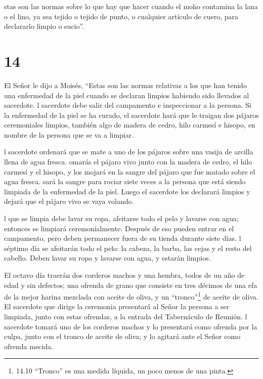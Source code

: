  stas son las normas sobre lo que hay que hacer cuando el
moho contamina la lana o el lino, ya sea tejido o tejido de punto, o
cualquier artículo de cuero, para declararlo limpio o sucio''.

\hypertarget{section-13}{%
\section{14}\label{section-13}}

 El Señor le dijo a Moisés,  ``Estas son las
normas relativas a los que han tenido una enfermedad de la piel cuando
se declaran limpios habiendo sido llevados al sacerdote.  l
sacerdote debe salir del campamento e inspeccionar a la persona. Si la
enfermedad de la piel se ha curado,  el sacerdote hará que
le traigan dos pájaros ceremoniales limpios, también algo de madera de
cedro, hilo carmesí e hisopo, en nombre de la persona que se va a
limpiar.

 l sacerdote ordenará que se mate a uno de los pájaros sobre
una vasija de arcilla llena de agua fresca.  omarás el
pájaro vivo junto con la madera de cedro, el hilo carmesí y el hisopo, y
los mojará en la sangre del pájaro que fue matado sobre el agua fresca.
 sará la sangre para rociar siete veces a la persona que
está siendo limpiada de la enfermedad de la piel. Luego el sacerdote los
declarará limpios y dejará que el pájaro vivo se vaya volando.

 l que se limpia debe lavar su ropa, afeitarse todo el pelo
y lavarse con agua; entonces se limpiará ceremonialmente. Después de eso
pueden entrar en el campamento, pero deben permanecer fuera de su tienda
durante siete días.  l séptimo día se afeitarán todo el
pelo: la cabeza, la barba, las cejas y el resto del cabello. Deben lavar
su ropa y lavarse con agua, y estarán limpios.

 El octavo día traerán dos corderos machos y una hembra,
todos de un año de edad y sin defectos; una ofrenda de grano que
consiste en tres décimos de una efa de la mejor harina mezclada con
aceite de oliva, y un ``tronco''\footnote{14.10 ``Tronco'' es una medida
  líquida, un poco menos de una pinta.} de aceite de oliva.
 El sacerdote que dirige la ceremonia presentará al Señor
la persona a ser limpiada, junto con estas ofrendas, a la entrada del
Tabernáculo de Reunión.  l sacerdote tomará uno de los
corderos machos y lo presentará como ofrenda por la culpa, junto con el
tronco de aceite de oliva; y lo agitará ante el Señor como ofrenda
mecida.

